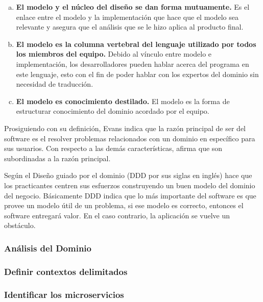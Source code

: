 \vspace{-1em}
\begin{enumerate}[a.]
  \item \textbf{El modelo y el núcleo del diseño se dan forma mutuamente.}
    Es el enlace entre el modelo y la implementación que hace que el modelo sea relevante y asegura que el
    análisis que se le hizo aplica al producto final.
  \item \textbf{El modelo es la columna vertebral del lenguaje utilizado por todos los miembros del equipo.}
    Debido al vínculo entre modelo e implementación, los desarrolladores pueden hablar acerca del
    programa en este lenguaje, esto con el fin de poder hablar con los expertos del dominio sin
    necesidad de traducción.
  \item \textbf{El modelo es conocimiento destilado.}
    El modelo es la forma de estructurar conocimiento del dominio acordado por el equipo.
\end{enumerate}
\vspace{-1em}

Prosiguiendo con su definición, Evans indica que la razón principal de ser del software es el
resolver problemas relacionados con un dominio en específico para sus usuarios.
Con respecto a las demás características, afirma que son subordinadas a la razón principal.

Según \cite{percival2020architecture} el Diseño guiado por el dominio (DDD por sus siglas en inglés)
hace que los practicantes centren sus esfuerzos construyendo un buen modelo del dominio del negocio.
Básicamente DDD indica que lo más importante del software es que provee un modelo útil de un problema,
si ese modelo es correcto, entonces el software entregará valor.
En el caso contrario, la aplicación se vuelve un obstáculo.


\subsubsection{Análisis del Dominio}


\subsubsection{Definir contextos delimitados}


\subsubsection{Identificar los microservicios}


